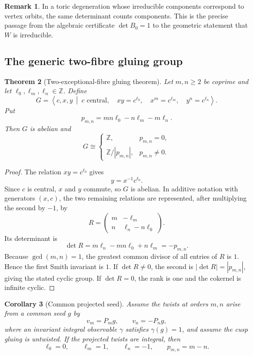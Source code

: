 \documentclass[11pt,reqno]{amsart}
\numberwithin{equation}{section}
\newcommand{\Z}{\mathbb Z}
\newtheorem{theorem}{Theorem}[section]
\newtheorem{corollary}[theorem]{Corollary}
\theoremstyle{definition}
\newtheorem{remark}[theorem]{Remark}
\begin{document}
\begin{remark}
In a toric degeneration whose irreducible components correspond to vertex orbits, the same determinant counts components. This is the precise passage from the algebraic certificate $\det B_0=1$ to the geometric statement that $W$ is irreducible.
\end{remark}

\subsection{The generic two-fibre gluing group}

\begin{theorem}[Two-exceptional-fibre gluing theorem]\label{thm:gluing-group}
Let $m,n\ge2$ be coprime and let $\ell_0,\ell_m,\ell_n\in\Z$. Define
\[
G=\left\langle c,x,y\ \middle|\
 c\text{ central},\quad
 xy=c^{\ell_0},\quad
 x^m=c^{\ell_m},\quad
 y^n=c^{\ell_n}
\right\rangle.
\]
Put
\begin{equation}\label{eq:general-defect}
p_{m,n}=mn\ell_0-n\ell_m-m\ell_n.
\end{equation}
Then $G$ is abelian and
\[
G\cong
\begin{cases}
\Z,&p_{m,n}=0,\\
\Z/|p_{m,n}|,&p_{m,n}\ne0.
\end{cases}
\]
\end{theorem}

\begin{proof}
The relation $xy=c^{\ell_0}$ gives
\[
y=x^{-1}c^{\ell_0}.
\]
Since $c$ is central, $x$ and $y$ commute, so $G$ is abelian. In additive notation with generators $(x,c)$, the two remaining relations are represented, after multiplying the second by $-1$, by
\[
R=
\begin{pmatrix}
m&-\ell_m\\
n&\ell_n-n\ell_0
\end{pmatrix}.
\]
Its determinant is
\[
\det R=m\ell_n-mn\ell_0+n\ell_m=-p_{m,n}.
\]
Because $\gcd(m,n)=1$, the greatest common divisor of all entries of $R$ is $1$. Hence the first Smith invariant is $1$. If $\det R\ne0$, the second is $|\det R|=|p_{m,n}|$, giving the stated cyclic group. If $\det R=0$, the rank is one and the cokernel is infinite cyclic.
\end{proof}

\begin{corollary}[Common projected seed]\label{cor:projected-defect}
Assume the twists at orders $m,n$ arise from a common seed $g$ by
\[
v_m=P_mg,
\qquad
v_n=-P_ng,
\]
where an invariant integral observable $\gamma$ satisfies $\gamma(g)=1$, and assume the cusp gluing is untwisted. If the projected twists are integral, then
\[
\ell_0=0,
\qquad
\ell_m=1,
\qquad
\ell_n=-1,
\qquad
p_{m,n}=m-n.
\]
\end{corollary}
\end{document}
